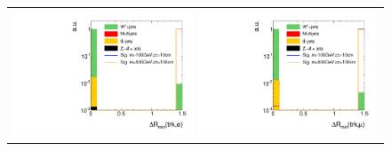 \begin{figure}[!b]
  \centering 
  \vspace{25pt}
  \begin{tabular}{c}
    \includegraphics[width=0.49\textwidth]{figures/analysis_2/AnalysisSelection/htrackdRminElec_log.pdf}
    \includegraphics[width=0.49\textwidth]{figures/analysis_2/AnalysisSelection/htrackdRminMuon_log.pdf}\\


\end{tabular}
\end{figure}
